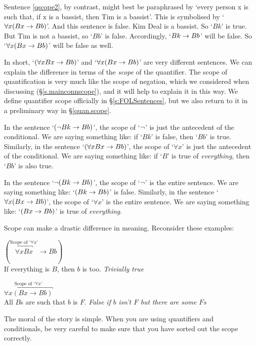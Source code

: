 Sentence \ref{qscope2}, by contrast, might best be paraphrased by `every person x is such that, if x is a bassist, then Tim is a bassist'. This is symbolised by `$\forall x (Bx \rightarrow Bb)$'. And this sentence is false. Kim Deal is a bassist. So `$Bk$' is true. But Tim is not a bassist, so `$Bb$' is false. Accordingly, `$Bk \rightarrow Bb$' will be false. So `$\forall x (Bx \rightarrow Bb)$' will be false as well. 

In short, `$(\forall x Bx \rightarrow Bb)$' and `$\forall x (Bx \rightarrow Bb)$' are very different sentences. We can explain the difference in terms of the \emph{scope} of the quantifier.  The scope of quantification is very much like the scope of negation, which we considered when discussing \TFL (§\ref{s.mainconnscope}), and it will help to explain it in this way. We define quantifier scope officially in §\ref{s:FOLSentences}, but we also return to it in a preliminary way in §\ref{quan.scope}.

In the sentence `$(\neg Bk \rightarrow Bb)$', the scope of `$\neg$' is just the antecedent of the conditional. We are saying something like: if `$Bk$' is false, then `$Bb$' is true. Similarly, in the sentence `$(\forall x Bx \rightarrow Bb)$', the scope of `$\forall x$' is just the antecedent of the conditional. We are saying something like: if `$B$' is true of \emph{everything}, then `$Bb$' is also true. 

In the sentence `$\neg(Bk \rightarrow Bb)$', the scope of `$\neg$' is the entire sentence. We are saying something like: `$(Bk \rightarrow Bb)$' is false. Similarly, in the sentence `$\forall x (Bx \rightarrow Bb)$', the scope of `$\forall x$' is the entire sentence. We are saying something like: `$(Bx \rightarrow Bb)$' is true of \emph{everything}.

Scope can make a drastic difference in meaning. Reconsider these examples:
\begin{earg}
    			\item[\ex{ben1}] $(\overbracket{\forall x Bx}^{\text{Scope of `$\forall x$'}}\to Bb)$\\ If everything is $B$, then $b$ is too. \emph{Trivially true}
    			\item[\ex{ben2}] $\overbracket{\forall x (Bx \to Bb)}^{\text{Scope of `$\forall x$'}}$\\ All $B$s are such that $b$ is $F$. \emph{False if $b$ isn't $F$ but there are some $F$s}
    		\end{earg}

The moral of the story is simple. When you are using quantifiers and conditionals, be very careful to make sure that you have sorted out the scope correctly. 

